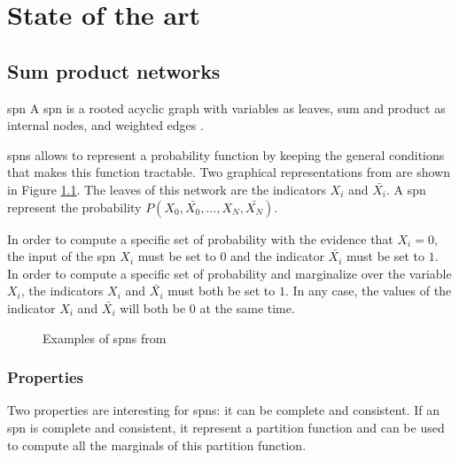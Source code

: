 
\chapter{State of the art}
\label{cha:soa}

\section{Sum product networks}

\begin{definition}{\Gls{spn}}
A \gls{spn} is a rooted acyclic graph with variables as leaves, sum and product as internal nodes, and weighted edges \cite{spns}.
\end{definition}

\Glspl{spn} allows to represent a probability function by keeping the general conditions that makes this function tractable. Two graphical representations from \cite{spns} are shown in Figure \ref{fig:spn_example}. The leaves of this network are the indicators $X_i$ and $\bar{X_i}$. A \gls{spn} represent the probability $P(X_0, \bar{X_0}, ...,  X_N, \bar{X_N})$.

In order to compute a specific set of probability with the evidence that $X_i=0$, the input of the \gls{spn} $X_i$ must be set to $0$ and the indicator $\bar{X_i}$ must be set to $1$. In order to compute a specific set of probability and marginalize over the variable $X_i$, the indicators $X_i$ and $\bar{X_i}$ must both be set to $1$. In any case, the values of the indicator $X_i$ and $\bar{X_i}$ will both be $0$ at the same time.

\begin{figure}[!ht]
\begin{mdframed}
	
	
	\caption{Examples of \glspl{spn} from \cite{spns}}
	\label{fig:spn_example}
\end{mdframed}
\end{figure}

\subsection{Properties}

Two properties are interesting for \glspl{spn}: it can be complete and consistent. If an \gls{spn} is complete and consistent, it represent a partition function and can be used to compute all the marginals of this partition function.

